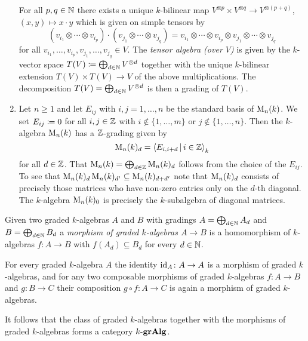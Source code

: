 \begin{example}
\begin{enumerate}
      For all $p, q \in \mathbb{N}$ there exists a unique $k$-bilinear map $V^{\otimes p} \times V^{\otimes q} \to V^{\otimes(p+q)}$, $(x, y) \mapsto x \cdot y$ which is given on simple tensors by
      \[
          (v_{i_1} \otimes \dotsb \otimes v_{i_p}) \cdot (v_{j_1} \otimes \dotsb \otimes v_{j_q})
        = v_{i_1} \otimes \dotsb \otimes v_{i_p} \otimes v_{j_1} \otimes \dotsb \otimes v_{j_q}
      \]
      for all $v_{i_1}, \dotsc, v_{i_p}, v_{j_1}, \dotsc, v_{j_q} \in V$.
      The \emph{tensor algebra \textup(over $V$\textup)} is given by the $k$-vector space $T(V) \coloneqq \bigoplus_{d \in \mathbb{N}} V^{\otimes d}$ together with the unique $k$-bilinear extension $T(V) \times T(V) \to V$ of the above multiplications.
      The decomposition $T(V) = \bigoplus_{d \in \mathbb{N}} V^{\otimes d}$ is then a grading of $T(V)$.
    \item
      Let $n \geq 1$ and let $E_{ij}$ with $i,j = 1, \dotsc, n$ be the standard basis of $\operatorname{M}_n(k)$.
      We set $E_{ij} \coloneqq 0$ for all $i,j \in \mathbb{Z}$ with $i \notin \{1, \dotsc, m\}$ or $j \notin \{1, \dotsc, n\}$.
      Then the $k$-algebra $\operatorname{M}_n(k)$ has a $\mathbb{Z}$-grading given by
      \[
          \Mat_n(k)_d
        = \gen{ E_{i,i+d} \suchthat i \in \Integer }_k
      \]
      for all $d \in \mathbb{Z}$.
      That $\operatorname{M}_n(k) = \bigoplus_{d \in \mathbb{Z}} \operatorname{M}_n(k)_d$ follows from the choice of the $E_{ij}$.
      To see that $\operatorname{M}_n(k)_{d} \operatorname{M}_n(k)_{d'} \subseteq \operatorname{M}_n(k)_{d + d'}$ note that $\operatorname{M}_n(k)_d$ consists of precisely those matrices who have non-zero entries only on the $d$-th diagonal.
      The $k$-algebra $\operatorname{M}_n(k)_0$ is precisely the $k$-subalgebra of diagonal matrices.
  \end{enumerate}
\end{example}


\begin{remark}
  Given two graded $k$-algebras $A$ and $B$ with gradings $A = \bigoplus_{d \in \mathbb{N}} A_d$ and $B = \bigoplus_{d \in \mathbb{N}} B_d$ a \emph{morphism of graded $k$-algebras $A \to B$} is a homomorphism of $k$-algebras $f \colon A \to B$ with $f(A_d) \subseteq B_d$ for every $d \in \mathbb{N}$.
  
  For every graded $k$-algebra $A$ the identity $\operatorname{id}_A \colon A \to A$ is a morphism of graded $k$-algebras, and for any two composable morphisms of graded $k$-algebras $f \colon A \to B$ and $g \colon B \to C$ their composition $g \circ f \colon A \to C$ is again a morphism of graded $k$-algebras.
  
  It follows that the class of graded $k$-algebras together with the morphisms of graded $k$-algebras forms a category $k\text{-}\mathbf{grAlg}$.
\end{remark}






